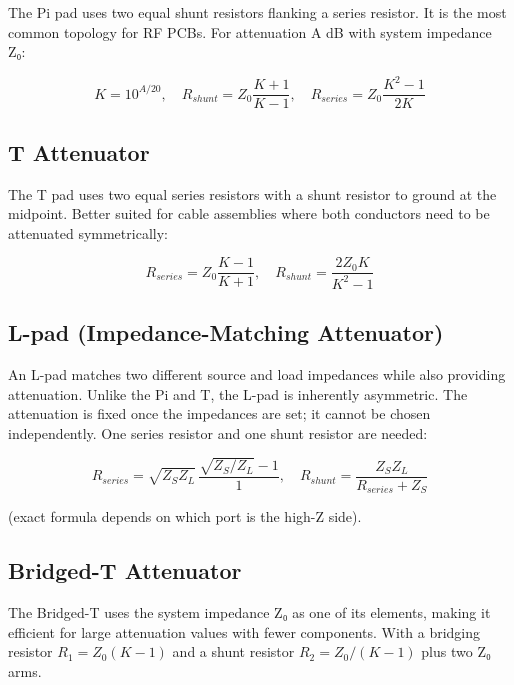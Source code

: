       

The Pi pad uses two equal shunt resistors flanking a series resistor. It is the most common topology for RF PCBs. For attenuation A dB with system impedance Z₀:


      
\[K = 10^{A/20}, \quad R_{shunt} = Z_0\dfrac{K+1}{K-1}, \quad R_{series} = Z_0\dfrac{K^2-1}{2K}\]

      

\subsection{T Attenuator}

      

The T pad uses two equal series resistors with a shunt resistor to ground at the midpoint. Better suited for cable assemblies where both conductors need to be attenuated symmetrically:

      
\[R_{series} = Z_0\dfrac{K-1}{K+1}, \quad R_{shunt} = \dfrac{2Z_0 K}{K^2-1}\]

      

\subsection{L-pad (Impedance-Matching Attenuator)}

      

An L-pad matches two different source and load impedances while also providing attenuation. Unlike the Pi and T, the L-pad is inherently asymmetric. The attenuation is fixed once the impedances are set; it cannot be chosen independently. One series resistor and one shunt resistor are needed:

      
\[R_{series} = \sqrt{Z_S Z_L}\,\dfrac{\sqrt{Z_S/Z_L}-1}{1}, \quad R_{shunt} = \dfrac{Z_S Z_L}{R_{series}+Z_S}\]

      

(exact formula depends on which port is the high-Z side).

      

\subsection{Bridged-T Attenuator}

      

The Bridged-T uses the system impedance Z₀ as one of its elements, making it efficient for large attenuation values with fewer components. With a bridging resistor $R_1 = Z_0(K-1)$ and a shunt resistor $R_2 = Z_0/(K-1)$ plus two Z₀ arms.

